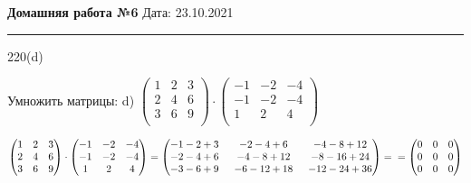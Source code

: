\noindent
\large\textbf{Домашняя работа №6} \hfill  Дата: 23.10.2021  \\
\noindent\rule{7in}{2pt}

\begin{problem}{220(d)}
 
Умножить матрицы: 
d)
$\left(
\begin{array}{rrr}
1 & 2 & 3 \\
2 & 4 & 6 \\
3 & 6 & 9 \\
\end{array}
\right)
\cdot
\left(
\begin{array}{rrr}
-1 & -2 & -4 \\
-1 & -2 & -4 \\
1 & 2 & 4 \\
\end{array}
\right)
$
\end{problem}
\begin{solution}
\ensuremath{
\begin{pmatrix}
	1 & 2 & 3\\ 2 & 4 & 6 \\ 3 & 6 & 9\\
\end{pmatrix} \cdot
\begin{pmatrix}
	-1 & -2 & -4 \\ -1 & -2 & -4 \\ 1 & 2 & 4 \\
\end{pmatrix} = 
\begin{pmatrix}
	-1-2+3 \enspace & -2 -4 + 6\enspace & -4 -8 + 12\\
	-2-4+6 \enspace & -4-8+12 \enspace  & -8-16+24\\
	-3-6+9 \enspace & -6-12+18 \enspace & -12 -24 + 36\\
\end{pmatrix} =\\=
\begin{pmatrix}
	0 & 0 & 0\\
	0 & 0 & 0\\
	0 & 0 & 0\\
\end{pmatrix}
}

\end{solution} 

